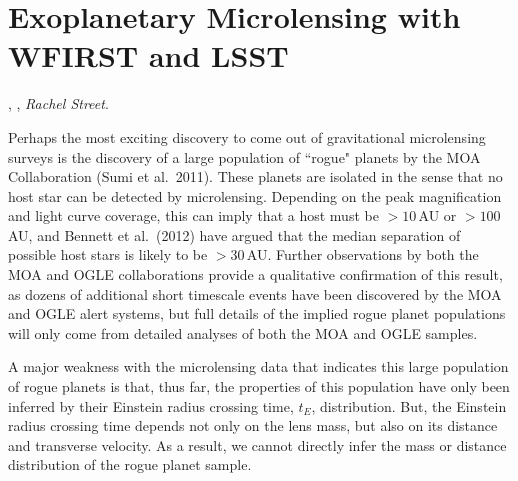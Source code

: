 %
%
%
%

\section{Exoplanetary Microlensing with WFIRST and LSST}
\def\secname{\chpname:microlensing}\label{sec:\secname}

,
,
{\it Rachel Street}.

Perhaps the most exciting discovery to come out of gravitational
microlensing surveys is the discovery of a large population of ``rogue"
planets by the MOA Collaboration (Sumi et al.\ 2011). These planets
are isolated in the sense that no host star can be detected
by microlensing. Depending on the peak magnification and light curve
coverage, this can imply that a host must be $> 10\,$AU or $> 100\,$AU,
and Bennett et al.\ (2012) have argued that the median separation
of possible host stars is likely to be $> 30\,$AU.
Further observations by both the MOA and OGLE collaborations provide
a qualitative confirmation of this result, as dozens of additional
short timescale events have been discovered by the MOA and OGLE
alert systems, but full details of the implied rogue planet
populations  will only come from detailed analyses of both the MOA
and OGLE samples.

A major weakness with the microlensing data that indicates this
large population of rogue planets is that, thus far, the properties
of this population have only been inferred by their Einstein radius
crossing time, $t_E$, distribution. But, the Einstein radius crossing
time depends not only on the lens mass, but also on its distance and
transverse velocity. As a result, we cannot directly infer the mass or distance
distribution of the rogue planet sample.

